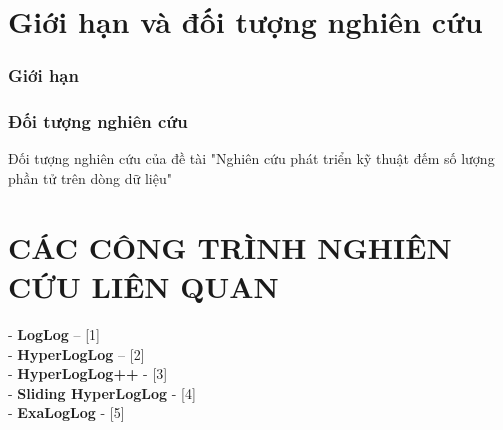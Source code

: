 \documentclass[a4paper,13pt]{article}
\theoremstyle{mytheor}
\begin{document}
\section{Giới hạn và đối tượng nghiên cứu }
\subsubsection{Giới hạn}
\subsubsection{Đối tượng nghiên cứu }
Đối tượng nghiên cứu của đề tài "Nghiên cứu phát triển kỹ thuật đếm số lượng phần tử trên dòng dữ liệu"

\section{CÁC CÔNG TRÌNH NGHIÊN CỨU LIÊN QUAN }
- \textbf{LogLog} – [1] \\

- \textbf{HyperLogLog} – [2]\\

- \textbf{HyperLogLog++} - [3] \\

- \textbf{Sliding HyperLogLog} - [4]\\

- \textbf{ExaLogLog} - [5] \\
\end{document}
